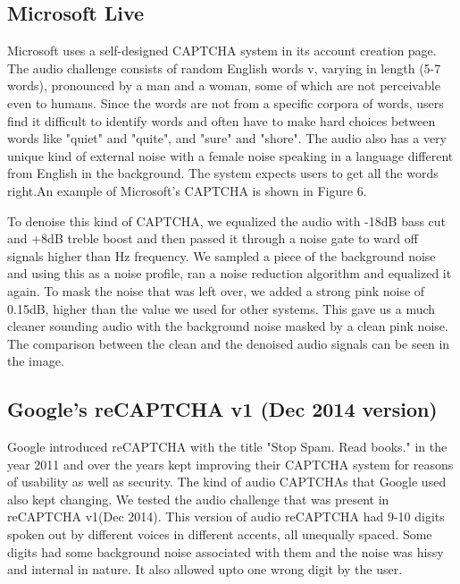 \subsection{Microsoft Live}
\label{sec:live}
Microsoft uses a self-designed CAPTCHA system in its account creation page. The audio challenge consists of random English words v, varying in length (5-7 words), pronounced by a man and a woman, some of which are not perceivable even to humans. Since the words are not from a specific corpora of words, users find it difficult to identify words and often have to make hard choices between words like "quiet" and "quite", and "sure" and "shore". The audio also has a very unique kind of external noise with a female noise speaking in a language different from English in the background. The system expects users to get all the words right.An example of Microsoft's CAPTCHA is shown in Figure 6.\newline

To denoise this kind of CAPTCHA, we equalized the audio with -18dB bass cut and +8dB treble boost and then passed it through a noise gate to ward off signals higher than Hz frequency. We sampled a piece of the background noise and using this as a noise profile, ran a noise reduction algorithm and equalized it again. To mask the noise that was left over, we added a strong pink noise of 0.15dB, higher than the value we used for other systems. This gave us a much cleaner sounding audio with the background noise masked by a clean pink noise. The comparison between the clean and the denoised audio signals can be seen in the image.\newline

\subsection{Google's reCAPTCHA v1 (Dec 2014 version)}
\label{sec:recaptchav1}
Google introduced reCAPTCHA with the title "Stop Spam. Read books." in the year 2011 and over the years kept improving their CAPTCHA system for reasons of usability as well as security. The kind of audio CAPTCHAs that Google used also kept changing. We tested the audio challenge that was present in reCAPTCHA v1(Dec 2014). This version of audio reCAPTCHA had 9-10 digits spoken out by different voices in different accents, all unequally spaced. Some digits had some background noise associated with them and the noise was hissy and internal in nature. It also allowed upto one wrong digit by the user.\newline

